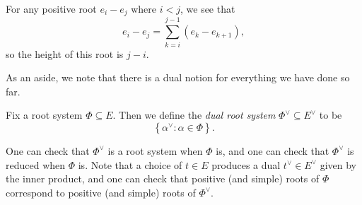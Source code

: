 \documentclass[../notes.tex]{subfiles}
\begin{document}
\begin{example}
	For any positive root $e_i-e_j$ where $i<j$, we see that
	\[e_i-e_j=\sum_{k=i}^{j-1}(e_k-e_{k+1}),\]
	so the height of this root is $j-i$.
\end{example}
As an aside, we note that there is a dual notion for everything we have done so far.
\begin{definition}
	Fix a root system $\Phi\subseteq E$. Then we define the \textit{dual root system} $\Phi^\lor\subseteq E^\lor$ to be
	\[\left\{\alpha^\lor:\alpha\in\Phi\right\}.\]
\end{definition}
\begin{remark}
	One can check that $\Phi^\lor$ is a root system when $\Phi$ is, and one can check that $\Phi^\lor$ is reduced when $\Phi$ is. Note that a choice of $t\in E$ produces a dual $t^\lor\in E^\lor$ given by the inner product, and one can check that positive (and simple) roots of $\Phi$ correspond to positive (and simple) roots of $\Phi^\lor$.
\end{remark}
\end{document}
